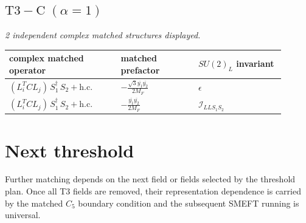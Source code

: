 \documentclass[9pt]{article}
\begin{document}
\subsection*{$ \mathrm{T3-C}\;(\alpha=1) $}
\textit{2 independent complex matched structures displayed. }
\begin{longtable}{@{}p{0.36\linewidth}p{0.25\linewidth}p{0.29\linewidth}@{}}
\toprule
complex matched operator & matched prefactor & $SU(2)_L$ invariant \\
\midrule
$ (L_i^T C L_j)\,S_1^\dagger\,S_2+\mathrm{h.c.} $ & $ - \frac{\sqrt{3} \overline{y_{1}} \overline{y_{2}}}{2 M_F} $ & $ \epsilon $ \\
$ (L_i^T C L_j)\,S_1^\dagger\,S_2+\mathrm{h.c.} $ & $ - \frac{\overline{y_{1}} \overline{y_{2}}}{2 M_F} $ & $ \mathcal{I}_{LLS_1S_2} $ \\
\bottomrule
\end{longtable}
\section*{Next threshold}
Further matching depends on the next field or fields selected by the threshold plan.  Once all T3 fields are removed, their representation dependence is carried by the matched $C_5$ boundary condition and the subsequent SMEFT running is universal.
\end{document}
